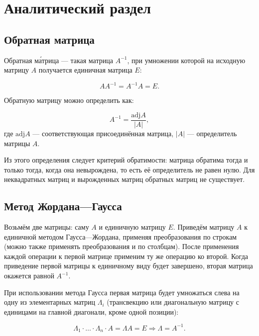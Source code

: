 \chapter{Аналитический раздел}


\section{Обратная матрица}

Обратная ма́трица — такая матрица $A^{-1}$, при умножении которой на исходную матрицу $A$ получается единичная матрица $E$:

\begin{equation}
    \label{eq:eq_a1}
    AA^{-1}=A^{-1}A=E.
\end{equation}

Обратную матрицу можно определить как:

\begin{equation}
    \label{eq:eq_a2}
    A^{-1}={\frac {{\mbox{adj}}A}{|A|}},
\end{equation}
где ${\mbox{adj}}A$ — соответствующая присоединённая матрица, $|A|$ — определитель матрицы $A$.

Из этого определения следует критерий обратимости: матрица обратима тогда и только тогда, когда она невырождена, то есть её определитель не равен нулю.
Для неквадратных матриц и вырожденных матриц обратных матриц не существует.


\section{Метод Жордана—Гаусса}


Возьмём две матрицы: саму $A$ и единичную матрицу $E$. Приведём матрицу $A$ к единичной методом Гаусса—Жордана, применяя преобразования по строкам (можно также применять преобразования и по столбцам).
После применения каждой операции к первой матрице применим ту же операцию ко второй.
Когда приведение первой матрицы к единичному виду будет завершено, вторая матрица окажется равной $A^{-1}$.

При использовании метода Гаусса первая матрица будет умножаться слева на одну из элементарных матриц $\Lambda_{i}$ (трансвекцию или диагональную матрицу с единицами на главной диагонали, кроме одной позиции):

\begin{equation}
    \label{eq:eq_a10}
    \Lambda _{1}\cdot \dots \cdot \Lambda _{n}\cdot A=\Lambda A=E\Rightarrow \Lambda =A^{-1}.
\end{equation}

